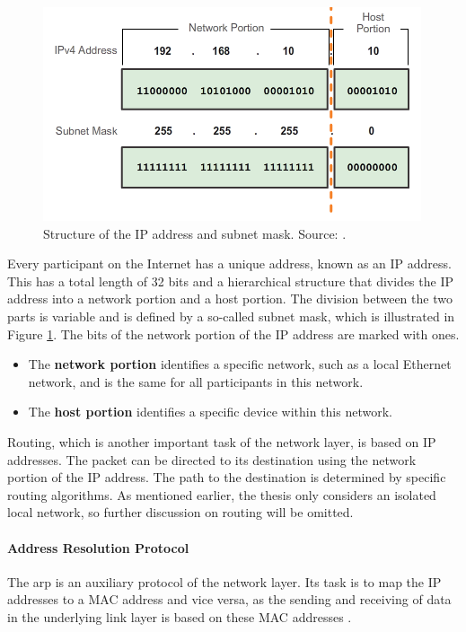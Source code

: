 \begin{figure}[h]
    \centering
    \includegraphics[width=0.8\linewidth]{figures/tcpip_refmodel/image8.png}
    \caption[Structure of the IP address and subnet mask]{Structure of the IP address and subnet mask. Source: \cite{CSE252ImageSubnet}.}
    \label{fig:IPSubnet}
\end{figure}

Every participant on the Internet has a unique address, known as an IP address. This has a total length of 32 bits and a hierarchical structure that divides the IP address into a network portion and a host portion. The division between the two parts is variable and is defined by a so-called subnet mask, which is illustrated in Figure \ref{fig:IPSubnet}. The bits of the network portion of the IP address are marked with ones.

\begin{itemize}
\item The \textbf{network portion} identifies a specific network, such as a local Ethernet network, and is the same for all participants in this network.
\item The \textbf{host portion} identifies a specific device within this network.
\end{itemize}

Routing, which is another important task of the network layer, is based on IP addresses. The packet can be directed to its destination using the network portion of the IP address. The path to the destination is determined by specific routing algorithms. As mentioned earlier, the thesis only considers an isolated local network, so further discussion on routing will be omitted.


\paragraph{Address Resolution Protocol}

The \ac{arp} is an auxiliary protocol of the network layer. Its task is to map the IP addresses to a MAC address and vice versa, as the sending and receiving of data in the underlying link layer is based on these MAC addresses \cite{Weigel2021}.


